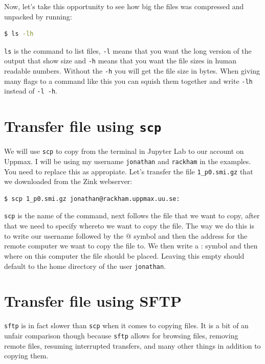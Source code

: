 \documentclass[watermark]{pbpreprint}
\begin{document}
\vspace{1\baselineskip}
Now, let's take this opportunity to see how big the files was compressed and
unpacked by running: 
\begin{lstlisting}[language=bash]
$ ls -lh
\end{lstlisting}
\texttt{ls} is the command to list files, \texttt{-l} means that you want the
long version of the output that show size and \texttt{-h} means that you want
the file sizes in human readable numbers. Without the \texttt{-h} you will get
the file size in bytes. When giving many flags to a command like this you can
squish them together and write \texttt{-lh} instead of \texttt{-l -h}.

\section{Transfer file using \texttt{scp}}
 We will use \texttt{scp} to copy from the terminal
in Jupyter Lab to our account on Uppmax. I will be using my username
\texttt{jonathan} and \texttt{rackham} in the examples. You need to replace
this as appropiate. Let's transfer the file \texttt{1\_p0.smi.gz} that we
downloaded from the Zink webserver:
%
\begin{lstlisting}[language=bash,escapechar={|}]
$ scp 1_p0.smi.gz jonathan@rackham.uppmax.uu.se:
\end{lstlisting}
\texttt{scp} is the name of the command, next follows the file that we want to
copy, after that we need to specify whereto we want to copy the file. The way
we do this is to write our username followed by the @ symbol and then the
address for the remote computer we want to copy the file to. We then write a :
symbol and then where on this computer the file should be placed. Leaving this
empty should default to the home directory of the user \texttt{jonathan}.

\section{Transfer file using SFTP}
\texttt{sftp} is in fact slower than \texttt{scp} when it comes to copying
files. It is a bit of an unfair comparison though because \texttt{sftp} allows
for browsing files, removing remote files, resuming interrupted transfers, and
many other things in addition to copying them.
\end{document}
